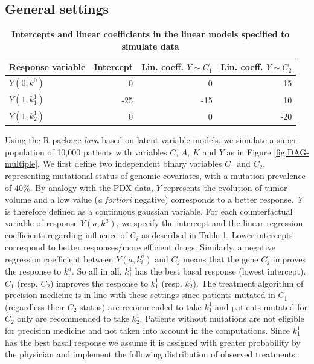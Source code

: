 \documentclass[a4paper,12pt,twoside,onecolumn,openright,final,oldfontcommands]{memoir}
\begin{document}
\subsection{General settings}\label{general-settings}

\begin{table}

\caption{\label{tab:simparam}\textbf{Intercepts and linear coefficients in the
linear models specified to simulate data}}
\centering
\begin{tabular}[t]{l|r|r|r}
\hline
Response variable & Intercept & Lin. coeff. $Y \sim C_1$ & Lin. coeff. $Y \sim C_2$\\
\hline
$Y(0,k^0)$ & 0 & 0 & 15\\
\hline
$Y(1,k^1_1)$ & -25 & -15 & 10\\
\hline
$Y(1,k^1_2)$ & 0 & 0 & -20\\
\hline
\end{tabular}
\end{table}




Using the R package \emph{lava} based on latent variable models, we
simulate a super-population of 10,000 patients with variables \(C\),
\(A\), \(K\) and \(Y\) as in Figure \ref{fig:DAG-multiple}. We first
define two independent binary variables \(C_1\) and \(C_2\),
representing mutational status of genomic covariates, with a mutation
prevalence of 40\%. By analogy with the PDX data, \(Y\) represents the
evolution of tumor volume and a low value (\emph{a fortiori} negative)
corresponds to a better response. \emph{Y} is therefore defined as a
continuous gaussian variable. For each counterfactual variable of
response \(Y(a, k^a)\), we specify the intercept and the linear
regression coefficients regarding influence of \(C_i\) as described in
Table \ref{tab:simparam}. Lower intercepts correspond to better
responses/more efficient drugs. Similarly, a negative regression
coefficient between \(Y(a, k^a_i)\) and \(C_j\) means that the gene
\(C_j\) improves the response to \(k^a_i\). So all in all, \(k^1_1\) has
the best basal response (lowest intercept). \(C_1\) (resp. \(C_2\))
improves the response to \(k^1_1\) (resp. \(k^1_2\)). The treatment
algorithm of precision medicine is in line with these settings since
patients mutated in \(C_1\) (regardless their \(C_2\) status) are
recommended to take \(k^1_1\) and patients mutated for \(C_2\) only are
recommended to take \(k^1_2\). Patients without mutations are not
eligible for precision medicine and not taken into account in the
computations. Since \(k^1_1\) has the best basal response we assume it
is assigned with greater probability by the physician and implement the
following distribution of observed treatments:
\end{document}
